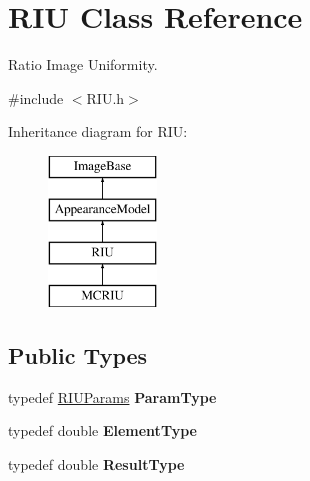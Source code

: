 \hypertarget{classRIU}{\section{R\-I\-U Class Reference}
\label{classRIU}
}


Ratio Image Uniformity.  




{\ttfamily \#include $<$R\-I\-U.\-h$>$}

Inheritance diagram for R\-I\-U\-:\begin{figure}[H]
\begin{center}
\leavevmode
\includegraphics[height=4.000000cm]{classRIU}
\end{center}
\end{figure}
\subsection*{Public Types}
\begin{DoxyCompactItemize}
\item 
\hypertarget{classRIU_a6dcd193ab39d41bc951369ff88176b13}{typedef \hyperlink{structRIUParams}{R\-I\-U\-Params} {\bfseries Param\-Type}}\label{classRIU_a6dcd193ab39d41bc951369ff88176b13}

\item 
\hypertarget{classRIU_a06a38fdd6b28e5899f20c794dda70c20}{typedef double {\bfseries Element\-Type}}\label{classRIU_a06a38fdd6b28e5899f20c794dda70c20}

\item 
\hypertarget{classRIU_afaa3e10406c92fc486eb3e880d3a4d07}{typedef double {\bfseries Result\-Type}}\label{classRIU_afaa3e10406c92fc486eb3e880d3a4d07}

\end{DoxyCompactItemize}
